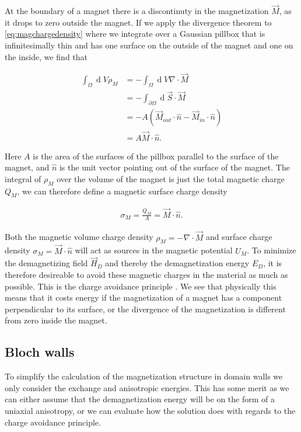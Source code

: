 \documentclass[1p]{elsarticle}		%
\renewcommand{\d}[1]{\ensuremath{\operatorname{d}\!{#1}}}
\numberwithin{equation}{section}
\begin{document}
At the boundary of a magnet there is a discontinuty in the magnetization $\vec{M}$, as it drops to zero outside the magnet. If we apply the divergence theorem to \eqref{eq:magchargedensity} where we integrate over a Gaussian pillbox that is infinitesimally thin and has one surface on the outside of the magnet and one on the inside, we find that

\begin{align*}
\int_{\Omega} \d V \rho_M  &= -\int_{\Omega} \d V \nabla \cdot \vec{M} \\
&= -\int_{\partial \Omega} \d {\vec{S}}\cdot\vec{M} \\
&= -A(\vec{M}_{out}\cdot\hat{n} - \vec{M}_{in} \cdot \hat{n}) \\
&= A \vec{M} \cdot\hat{n}.
\end{align*}

Here $A$ is the area of the surfaces of the pillbox parallel to the surface of the magnet, and $\hat{n}$ is the unit vector pointing out of the surface of the magnet. The integral of $\rho_M$ over the volume of the magnet is just the total magnetic charge $Q_M$, we can therefore define a magnetic surface charge density

\begin{align}
\label{eq:magsurfacecharge}
\sigma_M = \frac{Q_M}{A} = \vec{M}\cdot\hat{n}.
\end{align}

Both the magnetic volume charge density $\rho_M = -\nabla\cdot\vec{M}$ and surface charge density $\sigma_M = \vec{M}\cdot\hat{n}$ will act as sources in the magnetic potential $U_M$. To minimize the demagnetizing field $\vec{H}_D$ and thereby the demagnetization energy $E_D$, it is therefore desireable to avoid these magnetic charges in the material as much as possible. This is the charge avoidance principle \cite{Coey}. We see that physically this means that it costs energy if the magnetization of a magnet has a component perpendicular to its surface, or the divergence of the magnetization is different from zero inside the magnet.

\subsection{Bloch walls}
To simplify the calculation of the magnetization structure in domain walls we only consider the exchange and anisotropic energies. This has some merit as we can either assume that the demagnetization energy will be on the form of a uniaxial anisotropy, or we can evaluate how the solution does with regards to the charge avoidance principle.
\end{document}
